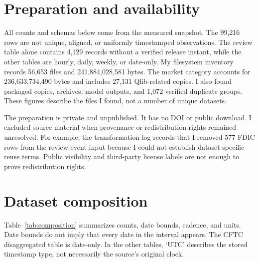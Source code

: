 \documentclass[10pt]{article}
\begin{document}
\section{Preparation and availability}
All counts and schemas below come from the measured snapshot. The 99,216 rows are not unique, aligned, or uniformly timestamped observations. The review table alone contains 4,129 records without a verified release instant, while the other tables are hourly, daily, weekly, or date-only. My filesystem inventory records 56,653 files and 241,884,028,581 bytes. The market category accounts for 236,633,734,490 bytes and includes 27,131 Qlib-related copies. I also found packaged copies, archives, model outputs, and 1,072 verified duplicate groups. These figures describe the files I found, not a number of unique datasets.

The preparation is private and unpublished. It has no DOI or public download. I excluded source material when provenance or redistribution rights remained unresolved. For example, the transformation log records that I removed 577 FDIC rows from the review-event input because I could not establish dataset-specific reuse terms. Public visibility and third-party license labels are not enough to prove redistribution rights.

\section{Dataset composition}
Table~\ref{tab:composition} summarizes counts, date bounds, cadence, and units. Date bounds do not imply that every date in the interval appears. The CFTC disaggregated table is date-only. In the other tables, `UTC' describes the stored timestamp type, not necessarily the source's original clock.
\end{document}
